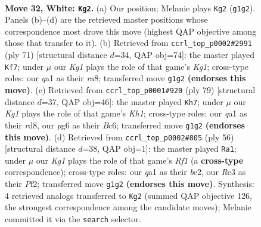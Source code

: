 \documentclass[11pt]{article}
\begin{document}
\clearpage

\begin{figure}[p]\centering
\begin{subfigure}{0.46\textwidth}\centering
\resizebox{\linewidth}{!}{%
\newchessgame
\chessboard[
  setfen={5b2/pp5p/6pk/8/8/PB2R1P1/5P1P/q5K1 w - - 2 32},
  showmover=false,
  pgfstyle=straightmove, color=movearrow, markmove={g1-g2}
]}
\caption{}
\end{subfigure}\hfill
\begin{subfigure}{0.46\textwidth}\centering
\resizebox{\linewidth}{!}{%
\newchessgame
\chessboard[
  setfen={R5k1/3r2pp/5p2/1b6/7P/2B5/1P3PP1/4K3 b - - 15 36},
  showmover=false,
  pgfstyle=straightmove, color=movearrow, markmove={g8-f7}
]}
\caption{}
\end{subfigure}
\\[4pt]
\begin{subfigure}{0.46\textwidth}\centering
\resizebox{\linewidth}{!}{%
\newchessgame
\chessboard[
  setfen={3R3k/pp4p1/2b1B2p/2r2p2/5P2/6PP/P6K/8 b - - 3 40},
  showmover=false,
  pgfstyle=straightmove, color=movearrow, markmove={h8-h7}
]}
\caption{}
\end{subfigure}\hfill
\begin{subfigure}{0.46\textwidth}\centering
\resizebox{\linewidth}{!}{%
\newchessgame
\chessboard[
  setfen={3B4/6kp/5pp1/8/2r5/6P1/P3bP1P/5RK1 w - - 0 29},
  showmover=false,
  pgfstyle=straightmove, color=movearrow, markmove={f1-a1}
]}
\caption{}
\end{subfigure}
\caption{\textbf{Move 32, White: \texttt{Kg2}.} (a) Our position; Melanie plays \texttt{Kg2} (\texttt{g1g2}). Panels (b)--(d) are the retrieved master positions whose correspondence most drove this move (highest QAP objective among those that transfer to it). (b) Retrieved from \texttt{ccrl\_top\_p0002\#2991} (ply 71) [structural distance $d$=34, QAP obj=74]: the master played \texttt{Kf7}; under $\mu$ our \emph{Kg1} plays the role of that game's \emph{Kg1}; cross-type roles: our \emph{q}a1 as their \emph{r}a8; transferred move \texttt{g1g2} \textbf{(endorses this move)}. (c) Retrieved from \texttt{ccrl\_top\_p0001\#920} (ply 79) [structural distance $d$=37, QAP obj=46]: the master played \texttt{Kh7}; under $\mu$ our \emph{Kg1} plays the role of that game's \emph{Kh1}; cross-type roles: our \emph{q}a1 as their \emph{r}d8, our \emph{p}g6 as their \emph{B}c6; transferred move \texttt{g1g2} \textbf{(endorses this move)}. (d) Retrieved from \texttt{ccrl\_top\_p0002\#805} (ply 56) [structural distance $d$=38, QAP obj=1]: the master played \texttt{Ra1}; under $\mu$ our \emph{Kg1} plays the role of that game's \emph{Rf1} (a \textbf{cross-type} correspondence); cross-type roles: our \emph{q}a1 as their \emph{b}e2, our \emph{R}e3 as their \emph{P}f2; transferred move \texttt{g1g2} \textbf{(endorses this move)}. Synthesis: 4 retrieved analogs transferred to \texttt{Kg2} (summed QAP objective 126, the strongest correspondence among the candidate moves); Melanie committed it via the \texttt{search} selector.}
\label{fig:thought-m62}
\end{figure}
\end{document}
